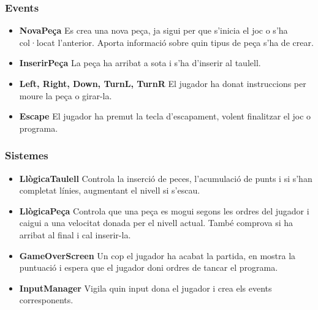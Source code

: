   \subsubsection{Events}

    \begin{itemize}
      \item {\bf NovaPeça}
        Es crea una nova peça, ja sigui per que s'inicia el joc o s'ha col·locat l'anterior. Aporta informació sobre quin tipus de peça s'ha de crear.
        
      \item {\bf InserirPeça}
        La peça ha arribat a sota i s'ha d'inserir al taulell.
        
      \item {\bf Left, Right, Down, TurnL, TurnR}
        El jugador ha donat instruccions per moure la peça o girar-la.
        
      \item {\bf Escape}
        El jugador ha premut la tecla d'escapament, volent finalitzar el joc o programa.
        
    \end{itemize}

  \subsubsection{Sistemes}

    \begin{itemize}
      \item {\bf LlògicaTaulell}
        Controla la inserció de peces, l'acumulació de punts i si s'han completat línies, augmentant el nivell si s'escau.
        
      \item {\bf LlògicaPeça}
        Controla que una peça es mogui segons les ordres del jugador i caigui a una velocitat donada per el nivell actual. També comprova si ha arribat al final i cal inserir-la.
        
      \item {\bf GameOverScreen}
        Un cop el jugador ha acabat la partida, en mostra la puntuació i espera que el jugador doni ordres de tancar el programa.
        
      \item {\bf InputManager}
        Vigila quin input dona el jugador i crea els events corresponents.
        
    \end{itemize}
    
